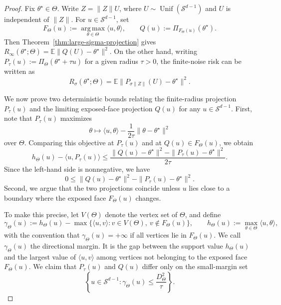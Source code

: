\documentclass[10pt,a4paper]{amsart}
\newcommand{\E}{\mathbb{E}}
\newcommand{\mcS}{\mathcal{S}}
\begin{document}
\begin{proof}
Fix $\theta^\star\in\Theta$. Write $Z=\|Z\|U$, where $U\sim\operatorname{Unif}(\mcS^{d-1})$ and $U$ is independent of $\|Z\|$. For $u\in\mcS^{d-1}$, set 
\[
F_\Theta(u) := \operatorname*{arg\,max}_{\theta\in\Theta} \langle u,\theta\rangle,
\qquad
Q(u):=\Pi_{F_\Theta(u)}(\theta^\star).
\] 
Then Theorem~\ref{thm:large-sigma-projection} gives $R_\infty(\theta^\star;\Theta)
=
\E\|Q(U)-\theta^\star\|^2$.
On the other hand, writing $P_\tau(u):=\Pi_\Theta(\theta^\star+\tau u)$ for a given radius $\tau>0$, the finite-noise risk can be written as 
\[
R_\sigma(\theta^\star;\Theta) 
= \E \bigl\| P_{\sigma\|Z\|}(U)-\theta^\star \bigr\|^2. 
\]

We now prove two deterministic bounds relating the finite-radius projection $P_\tau(u)$ and the limiting exposed-face projection $Q(u)$ for any $u \in \mcS^{d-1}$. 
First, note that $P_\tau(u)$ maximizes
\[
    \theta\mapsto
    \langle u,\theta\rangle
    -
    \frac{1}{2\tau}\|\theta-\theta^\star\|^2
\]
over $\Theta$. Comparing this objective at $P_\tau(u)$ and at
$Q(u)\in F_\Theta(u)$, we obtain
\[
    h_\Theta(u)-\langle u,P_\tau(u)\rangle
    \le
    \frac{
    \|Q(u)-\theta^\star\|^2
    -
    \|P_\tau(u)-\theta^\star\|^2
    }{2\tau}.
\]
Since the left-hand side is nonnegative, we have
\[
    0
    \le
    \|Q(u)-\theta^\star\|^2
    -
    \|P_\tau(u)-\theta^\star\|^2.
\]
Second, we argue that the two projections coincide unless $u$ lies close to a
boundary where the exposed face $F_\Theta(u)$ changes.

To make this precise, let $V(\Theta)$ denote the vertex set of $\Theta$, and define 
\[
\gamma_\Theta(u)
:=
h_\Theta(u)
-
\max\{ \langle u,v\rangle: v\in V(\Theta),\ v\notin F_\Theta(u) \},
\qquad
h_\Theta(u):=\max_{\theta\in\Theta}\langle u,\theta\rangle,
\] 
with the convention that $\gamma_\Theta(u)=+\infty$ if all vertices lie in $F_\Theta(u)$. We call $\gamma_\Theta(u)$ the directional margin. It is the gap between the support value $h_\Theta(u)$ and the largest value of
$\langle u,v\rangle$ among vertices not belonging to the exposed face
$F_\Theta(u)$. We claim that $P_\tau(u)$ and $Q(u)$ differ only on the small-margin set
\[
\left\{ u\in\mcS^{d-1}: \gamma_\Theta(u)\le \frac{D_{\Theta}^2}{\tau} \right\}. 
\]


\end{proof}
\end{document}
